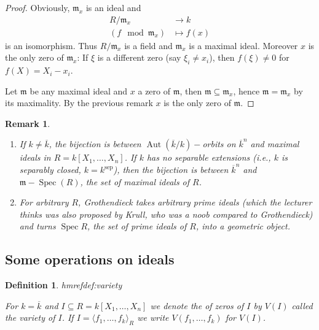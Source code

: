 \documentclass[DIV=14,parskip=full,pointednumbers]{scrartcl}
\newenvironment{alphanumerate}{\begin{enumerate}[label={\upshape(\alph*)}]}{\end{enumerate}}
\theoremstyle{cthm}
\theoremstyle{cdef}
\newtheorem{defi}{Definition}[subsection]
\newtheorem{rem}{Remark}[subsection]
\newcommand{\lbl}[1]{
	\label{#1}
	\edef\dummy{\curthm}
	\expandafter\xdef\csname thmref#1\endcsname{\dummy}
}
\newcommand{\mm}{\mathfrak{m}}
\newcommand{\Aut}{\operatorname{Aut}}
\newcommand{\longto}{\longrightarrow}
\begin{document}
\begin{proof}
 Obviously, $\mm_x$ is an ideal and
 \begin{align*}
  R/\mm_x &\longto k\\
  (f\mod \mm_x) &\longmapsto f(x)
 \end{align*}
is an isomorphism. Thus $R/\mm_x$ is a field and $\mm_x$ is a maximal ideal. Moreover $x$ is the only zero of $\mm_x$: If $\xi$ is a different zero (say $\xi_i\neq x_i$), then $f(\xi)\neq 0$ for $f(X) = X_i-x_i$.

Let $\mm$ be any maximal ideal and $x$ a zero of $\mm$, then $\mm\subseteq\mm_x$, hence $\mm=\mm_x$ by its maximality. By the previous remark $x$ is the only zero of $\mm$.
\end{proof}
\begin{rem}
 \begin{alphanumerate}
  \item If $k\neq\overline{k}$, the bijection is between $\Aut(\overline{k}/k)-$orbits on $\overline{k}^n$ and maximal ideals in $R=k[X_1,\ldots,X_n]$. If $k$ has no separable extensions (i.e., $k$ is \emph{separably closed}, $k=k^{\operatorname{sep}}$), then the bijection is between $\overline{k}^n$ and $\mm-\operatorname{Spec}(R)$, the set of maximal ideals of $R$.
  \item For arbitrary $R$, Grothendieck takes arbitrary prime ideals (which the lecturer thinks was also proposed by Krull, who was a noob compared to Grothendieck) and turns $\operatorname{Spec} R$, the set of prime ideals of $R$, into a geometric object.
 \end{alphanumerate}

\end{rem}


\subsection{Some operations on ideals}
\begin{defi}\lbl{def:variety}
 For $k=\overline{k}$ and $I\subseteq R = k[X_1,\ldots,X_n]$ we denote the of zeros of $I$ by $V(I)$ called the \emph{variety} of $I$. If $I=\langle f_1,\ldots,f_k\rangle_R$ we write $V(f_1,\ldots,f_k)$ for $V(I)$.
\end{defi}
\end{document}
